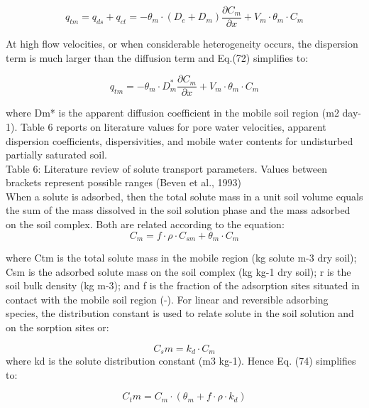 \begin{equation}
q_{tm} = q_{ds} + q_{ct} = - \theta_m \cdot (D_e + D_m) \frac{\partial C_m}{\partial x} + V_m\cdot \theta_m \cdot C_m
\end{equation}

At high flow velocities, or when considerable heterogeneity occurs, the dispersion term is much larger than the diffusion term and Eq.(72) simplifies to:

\begin{equation}
q_{tm} =  - \theta_m \cdot D_m^* \frac{\partial C_m}{\partial x} + V_m\cdot \theta_m \cdot C_m
\end{equation}

where Dm* is the apparent diffusion coefficient in the mobile soil region (m2 day-1). Table 6 reports on literature values for pore water velocities, apparent dispersion coefficients, dispersivities, and mobile water contents for undisturbed partially saturated soil.
\\
Table 6: Literature review of solute transport parameters. Values between brackets represent possible ranges (Beven et al., 1993)
\\

When a solute is adsorbed, then the total solute mass in a unit soil volume equals the sum of the mass dissolved in the soil solution phase and the mass adsorbed on the soil complex. Both are related according to the equation:
\begin{equation}
C_m = f \cdot \rho \cdot C_{sm} + \theta_m \cdot C_m
\end{equation}

where Ctm is the total solute mass in the mobile region (kg solute m-3 dry soil); Csm is the adsorbed solute mass on the soil complex (kg kg-1 dry soil); r is the soil bulk density (kg m-3); and f is the fraction of the adsorption sites situated in contact with the mobile soil region (-). For linear and reversible adsorbing species, the distribution constant is used to relate solute in the soil solution and on the sorption sites or:

\begin{equation}
C_sm = k_d \cdot C_m
\end{equation}
where kd is the solute distribution constant (m3 kg-1). Hence Eq. (74) simplifies to:

\begin{equation}
C_tm = C_m \cdot (\theta_m + f \cdot \rho \cdot k_d)
\end{equation}


